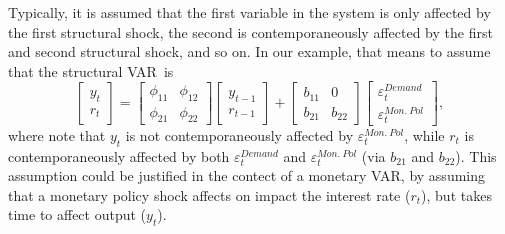 \documentclass[10pt]{article}
\begin{document}
Typically, it is assumed that the first variable in the system is only
affected by the first structural shock, the second is contemporaneously
affected by the first and second structural shock, and so on. In our
example, that means to assume that the structural VAR\ is
\begin{equation}
\left[
\begin{array}{c}
y_{t} \\
r_{t}%
\end{array}%
\right] =%
\begin{bmatrix}
\phi _{11} & \phi _{12} \\
\phi _{21} & \phi _{22}%
\end{bmatrix}%
\left[
\begin{array}{c}
y_{t-1} \\
r_{t-1}%
\end{array}%
\right] +\left[
\begin{array}{cc}
b_{11} & 0 \\
b_{21} & b_{22}%
\end{array}%
\right]
\begin{bmatrix}
\varepsilon _{t}^{Demand} \\
\varepsilon _{t}^{Mon.\ Pol}%
\end{bmatrix}%
,  \label{eq:struct_var_ch}
\end{equation}%
where note that $y_{t}$ is not contemporaneously affected by $\varepsilon
_{t}^{Mon.\ Pol}$, while $r_{t}$ is contemporaneously affected by both $%
\varepsilon _{t}^{Demand}$ and $\varepsilon _{t}^{Mon.\ Pol}$ (via $b_{21}$
and $b_{22}$). This assumption could be justified in the contect of a
monetary VAR, by assuming that a monetary policy shock affects on impact the
interest rate ($r_{t}$), but takes time to affect output ($y_{t}$).
\end{document}
